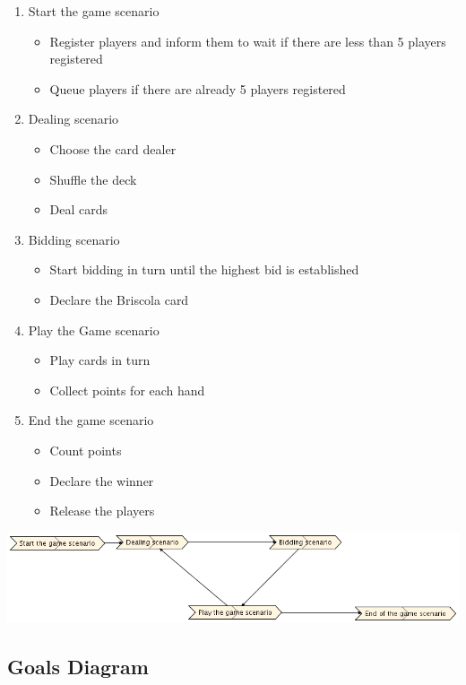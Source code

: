 \documentclass[a4paper]{article}
\begin{document}
\begin{enumerate}
  \item Start the game scenario
  \begin{itemize}
    \item Register players and inform them to wait if there are less than 5 players registered
    \item Queue players if there are already 5 players registered
  \end{itemize}
  \item Dealing scenario
  \begin{itemize}
    \item Choose the card dealer
    \item Shuffle the deck
    \item Deal cards
  \end{itemize}
  \item Bidding scenario
  \begin{itemize}
    \item Start bidding in turn until the highest bid is established
    \item Declare the Briscola card
  \end{itemize}
  \item Play the Game scenario
  \begin{itemize}
      \item Play cards in turn
      \item Collect points for each hand
  \end{itemize}
  \item End the game scenario
  \begin{itemize}
    \item Count points
    \item Declare the winner
    \item Release the players
  \end{itemize}
\end{enumerate}

\includegraphics[keepaspectratio,scale=0.3]{pdt/images/system_specification/scenarios.png}

\subsection{Goals Diagram}
\end{document}
